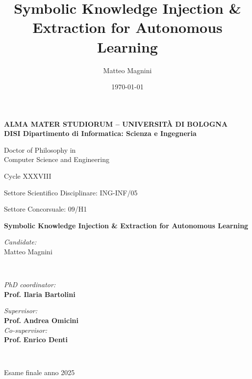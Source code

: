 \title{Symbolic Knowledge Injection \& Extraction for Autonomous Learning}
\author{Matteo Magnini}
\date{\today}

\begin{titlepage}
	\begin{center}

		\large
		\textbf{ALMA MATER STUDIORUM -- UNIVERSITÀ DI BOLOGNA \\ DISI Dipartimento di Informatica: Scienza e Ingegneria}
		\\
		\noindent\hrulefill
		\vspace{0.4cm}

		\Large
		Doctor of Philosophy in \\
		Computer Science and Engineering

		\vspace{0.4cm}

		Cycle XXXVIII

		\vspace{0.4cm}
		Settore Scientifico Disciplinare: ING-INF/05

		Settore Concorsuale: 09/H1

		\Huge
		\vspace{3cm}
		\textbf{
			Symbolic Knowledge Injection \& Extraction for Autonomous Learning
		}

		{\Large{
		\vspace{3cm}

		\textit{Candidate:\\}
		\centering
		Matteo Magnini}
		\\}
		\large
		\vspace{2.5cm}
		\begin{minipage}[t]{0.64\textwidth}
			\begin{flushleft}
				\textit{PhD coordinator:}
				\\
				\textbf{Prof. Ilaria Bartolini}
			\end{flushleft}
		\end{minipage}
		\begin{minipage}[t]{0.34\textwidth}
			\begin{flushright}
				\textit{Supervisor:}
				\\
				\textbf{Prof.} \textbf{Andrea Omicini}
				\\
				\vspace{0.4cm}
				\textit{Co-supervisor:}
				\\
				\textbf{Prof.} \textbf{Enrico Denti}
			\end{flushright}

		\end{minipage}\\

		\vfill
		\noindent\hrulefill
		\vspace{0.3cm}
		\Large

		Esame finale anno 2025
	\end{center}
\end{titlepage}
\restoregeometry